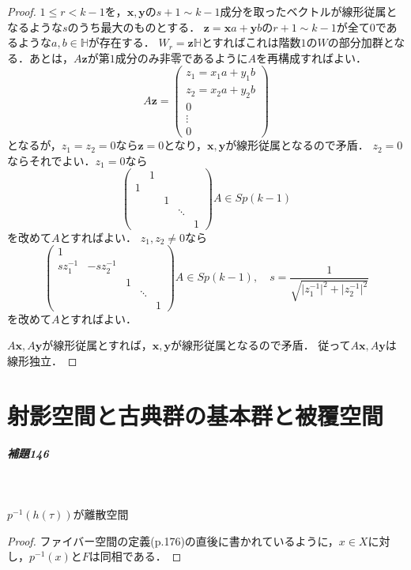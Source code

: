 \documentclass[a4paper, leqno]{ltjsreport}
\begin{document}
\begin{proof}
  $1 \leq r < k-1$を，$\boldsymbol{x}, \boldsymbol{y}$の$s+1 \sim k-1$成分を取ったベクトルが線形従属となるような$s$のうち最大のものとする．
  $\boldsymbol{z} = \boldsymbol{x}a + \boldsymbol{y}b$の$r+1 \sim k-1$が全て$0$であるような$a, b\in\mathbb{H}$が存在する．
  $W_r = \boldsymbol{z}\mathbb{H}$とすればこれは階数$1$の$W$の部分加群となる．あとは，$A\boldsymbol{z}$が第$1$成分のみ非零であるように$A$を再構成すればよい．
  \[A\boldsymbol{z} = \begin{pmatrix} z_1 = x_1a + y_1b \\ z_2 = x_2a + y_2b \\ 0 \\ \vdots \\ 0 \end{pmatrix}\]
  となるが，$z_1 = z_2 = 0$なら$\boldsymbol{z} = 0$となり，$\boldsymbol{x}, \boldsymbol{y}$が線形従属となるので矛盾．
  $z_2 = 0$ならそれでよい．$z_1 = 0$なら
  \[
  \begin{pmatrix}
    & 1 &   &        & \\
    1 &   &   &        & \\
    &   & 1 &        & \\
    &   &   & \ddots & \\
    &   &   &        & 1
  \end{pmatrix}
  A \in Sp(k-1)
  \]
  を改めて$A$とすればよい．
  $z_1, z_2 \neq 0$なら
  \[
  \begin{pmatrix}
    1          &             &   &        & \\
    s{z}_1^{-1} & -s{z}_2^{-1} &   &        & \\
    &             & 1 &        & \\
    &             &   & \ddots & \\
    &             &   &        & 1
  \end{pmatrix}
  A\in Sp(k-1),\quad s = \frac{1}{\sqrt{\lvert {z}_1^{-1} \rvert^2 + \lvert {z}_2^{-1} \rvert^2 }}
  \]
  を改めて$A$とすればよい．

  $A\boldsymbol{x}, A\boldsymbol{y}$が線形従属とすれば，$\boldsymbol{x}, \boldsymbol{y}$が線形従属となるので矛盾．
  従って$A\boldsymbol{x}, A\boldsymbol{y}$は線形独立．
\end{proof}

\chapter{射影空間と古典群の基本群と被覆空間}
\paragraph{補題146}~
\begin{screen}
  $p^{-1}(h(\tau))$が離散空間
\end{screen}
\begin{proof}
  ファイバー空間の定義(p.176)の直後に書かれているように，$x\in X$に対し，$p^{-1}(x)$と$F$は同相である．
\end{proof}
\end{document}
